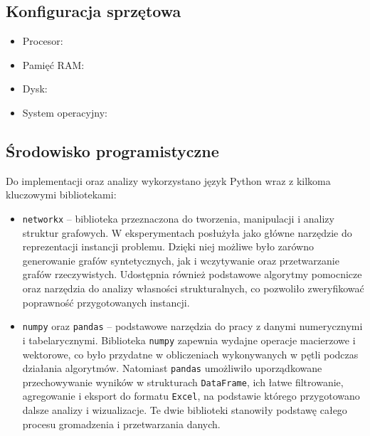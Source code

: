 \subsection{Konfiguracja sprzętowa}
\begin{itemize}
    \item Procesor: 
    \item Pamięć RAM: 
    \item Dysk: 
    \item System operacyjny: 
\end{itemize}

\subsection{Środowisko programistyczne}

Do implementacji oraz analizy wykorzystano język Python wraz z kilkoma kluczowymi bibliotekami:

\begin{itemize}
    \item \texttt{networkx} – biblioteka przeznaczona do tworzenia, manipulacji i analizy struktur grafowych. 
    W eksperymentach posłużyła jako główne narzędzie do reprezentacji instancji problemu. 
    Dzięki niej możliwe było zarówno generowanie grafów syntetycznych, 
    jak i wczytywanie oraz przetwarzanie grafów rzeczywistych. 
    Udostępnia również podstawowe algorytmy pomocnicze oraz narzędzia do analizy własności strukturalnych, 
    co pozwoliło zweryfikować poprawność przygotowanych instancji.

    \item \texttt{numpy} oraz \texttt{pandas} – podstawowe narzędzia do pracy z danymi numerycznymi i tabelarycznymi. 
    Biblioteka \texttt{numpy} zapewnia wydajne operacje macierzowe i wektorowe, co było przydatne w obliczeniach wykonywanych w pętli podczas działania algorytmów. 
    Natomiast \texttt{pandas} umożliwiło uporządkowane przechowywanie wyników w strukturach \texttt{DataFrame}, 
    ich łatwe filtrowanie, agregowanie i eksport do formatu \texttt{Excel}, 
    na podstawie którego przygotowano dalsze analizy i wizualizacje. 
    Te dwie biblioteki stanowiły podstawę całego procesu gromadzenia i przetwarzania danych.

\end{itemize}


